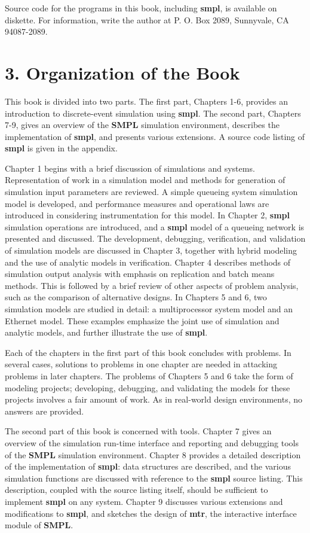 Source code for the programs in this book, including \textbf{smpl}, is available on
diskette. For information, write the author at P. O. Box 2089, Sunnyvale, CA
94087-2089.

\section*{3. Organization of the Book}

This book is divided into two parts. The first part, Chapters 1-6, provides an
introduction to discrete-event simulation using \textbf{smpl}. The second part, Chapters
7-9, gives an overview of the \textbf{SMPL} simulation environment, describes the
implementation of \textbf{smpl}, and presents various extensions. A source code listing
of \textbf{smpl} is given in the appendix.

Chapter 1 begins with a brief discussion of simulations and systems.
Representation of work in a simulation model and methods for generation of
simulation input parameters are reviewed. A simple queueing system simulation
model is developed, and performance measures and operational laws are
introduced in considering instrumentation for this model. In Chapter 2, \textbf{smpl}
simulation operations are introduced, and a \textbf{smpl} model of a queueing network is
presented and discussed. The development, debugging, verification, and
validation of simulation models are discussed in Chapter 3, together with
hybrid modeling and the use of analytic models in verification. Chapter 4
describes methods of simulation output analysis with emphasis on replication
and batch means methods. This is followed by a brief review of other aspects of
problem analysis, such as the comparison of alternative designs. In Chapters 5
and 6, two simulation models are studied in detail: a multiprocessor system
model and an Ethernet model. These examples emphasize the joint use of
simulation and analytic models, and further illustrate the use of \textbf{smpl}.

Each of the chapters in the first part of this book concludes with problems. In
several cases, solutions to problems in one chapter are needed in attacking
problems in later chapters. The problems of Chapters 5 and 6 take the form of
modeling projects; developing, debugging, and validating the models for these
projects involves a fair amount of work. As in real-world design environments,
no answers are provided.

The second part of this book is concerned with tools. Chapter 7 gives an
overview of the simulation run-time interface and reporting and debugging tools
of the \textbf{SMPL} simulation environment. Chapter 8 provides a detailed description
of the implementation of \textbf{smpl}: data structures are described, and the various
simulation functions are discussed with reference to the \textbf{smpl} source listing.
This description, coupled with the source listing itself, should be sufficient
to implement \textbf{smpl} on any system. Chapter 9 discusses various extensions and
modifications to \textbf{smpl}, and sketches the design of \textbf{mtr}, the interactive interface
module of \textbf{SMPL}.

